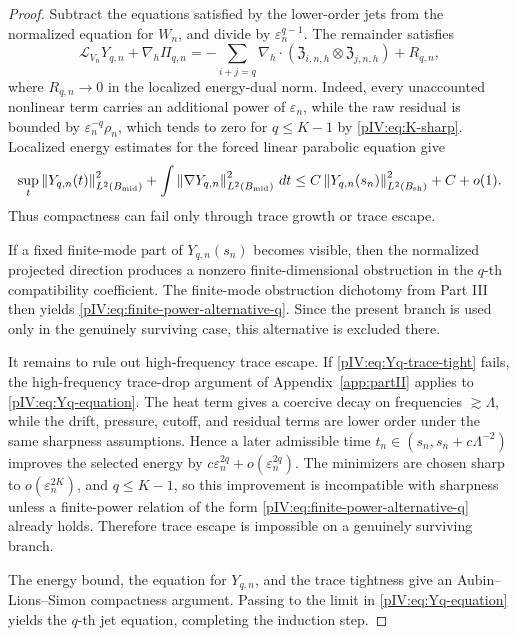 \documentclass[11pt]{article}
\numberwithin{equation}{section}
\theoremstyle{plain}
\theoremstyle{definition}
\theoremstyle{remark}
\newcommand{\eps}{\varepsilon}
\newcommand{\dt}{\,dt}
\newcommand{\nabh}{\nabla_h}
\newcommand{\norm}[2]{\left\|#1\right\|_{#2}}
\newcommand{\frakZ}{\mathfrak Z}
\begin{document}
\begin{proof}
Subtract the equations satisfied by the lower-order jets from the normalized equation
for \(W_n\), and divide by \(\eps_n^{q-1}\).  The remainder satisfies
\begin{equation}\label{pIV:eq:Yq-equation}
        \mathcal L_{V_n}Y_{q,n}+\nabh\Pi_{q,n}
        =-
        \sum_{i+j=q}\nabh\cdot
        (\frakZ_{i,n,h}\otimes\frakZ_{j,n,h})+R_{q,n},
\end{equation}
where \(R_{q,n}\to0\) in the localized energy-dual norm.  Indeed, every unaccounted
nonlinear term carries an additional power of \(\eps_n\), while the raw residual is
bounded by \(\eps_n^{-q}\rho_n\), which tends to zero for \(q\le K-1\) by
\eqref{pIV:eq:K-sharp}.  Localized energy estimates for the forced linear parabolic
equation give
\[
        \sup_t\norm{Y_{q,n}(t)}{L^2(B_{\rm mid})}^2
        +\int\norm{\nabla Y_{q,n}}{L^2(B_{\rm mid})}^2\dt
        \le C\norm{Y_{q,n}(s_n)}{L^2(B_{\rm sh})}^2+C+o(1).
\]
Thus compactness can fail only through trace growth or trace escape.

If a fixed finite-mode part of \(Y_{q,n}(s_n)\) becomes visible, then the normalized
projected direction produces a nonzero finite-dimensional obstruction in the
\(q\)-th compatibility coefficient.  The finite-mode obstruction dichotomy from Part
III then yields \eqref{pIV:eq:finite-power-alternative-q}.  Since the present branch is
used only in the genuinely surviving case, this alternative is excluded there.

It remains to rule out high-frequency trace escape.  If \eqref{pIV:eq:Yq-trace-tight}
fails, the high-frequency trace-drop argument of Appendix~\ref{app:partII} applies to
\eqref{pIV:eq:Yq-equation}.  The heat term gives a coercive decay on frequencies
\(\gtrsim\Lambda\), while the drift, pressure, cutoff, and residual terms are lower
order under the same sharpness assumptions.  Hence a later admissible time
\(t_n\in(s_n,s_n+c\Lambda^{-2})\) improves the selected energy by
\(c\eps_n^{2q}+o(\eps_n^{2q})\).  The minimizers are chosen sharp to
\(o(\eps_n^{2K})\), and \(q\le K-1\), so this improvement is incompatible with
sharpness unless a finite-power relation of the form \eqref{pIV:eq:finite-power-alternative-q}
already holds.  Therefore trace escape is impossible on a genuinely surviving branch.

The energy bound, the equation for \(Y_{q,n}\), and the trace tightness give an
Aubin--Lions--Simon compactness argument.  Passing to the limit in
\eqref{pIV:eq:Yq-equation} yields the \(q\)-th jet equation, completing the induction
step.
\end{proof}
\end{document}
